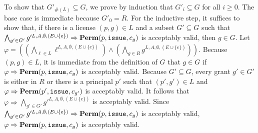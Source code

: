 \documentclass{acmtrans2m}
\newcommand{\rimp}{\Rightarrow}
\newcommand{\<}{
}
\renewcommand{\>}{\rangle}
\newcommand{\union}{\cup}
\renewcommand{\phi}{\varphi}
\newcommand{\card}[1]{\#({#1})}
\newcommand{\Permitted}{\mathit{\bf Perm}}
\newcommand{\cc}{e}
\newcommand{\scc}{E}
\newcommand{\issue}{\mathtt{issue}}
\newcommand{\transwithE}[5]{#1^{#2, #3, #4, #5}}
\begin{document}
\begin{sloppypar}
To show that $G'_{\card{L}} \subseteq G$, we prove by induction that $G'_i\subseteq G$ for all $i\ge 0$.
The base case is immediate because $G'_0 = R$.  For the inductive step, it suffices to show that, if
there is a license $(p,g)\in L$ and a subset $G'\subseteq G$ such that
$\bigwedge_{g'\in G'}\transwithE{g'}{L}{A}{\emptyset}{(E\union\{\cc\})}\rimp\Permitted(p,\issue, c_g)$
is acceptably valid, then $g\in G$.  Let
$\phi = ((\bigwedge_{\ell\in L}\transwithE{\ell}{L}{A}{\emptyset}{(\scc\union\{\cc\})})\land
(\bigwedge_{g\in R}\transwithE{g}{L}{A}{\emptyset}{(\scc\union\{\cc\})}))$.
Because $(p,g)\in L$, it is immediate from the definition of $G$ that $g\in G$ if
$\phi\rimp\Permitted(p, \issue, c_g)$ is acceptably valid.  Because $G'\subseteq G$, every grant
$g'\in G'$ is either in $R$ or there is a principal $p'$ such that $(p', g')\in L$ and
$\phi\rimp\Permitted(p', \issue, c_{g'})$ is acceptably valid.  It follows that
$\phi\rimp\bigwedge_{g'\in G'}\transwithE{g'}{L}{A}{\emptyset}{(E\union\{\cc\})}$ is acceptably valid.
Since
$\bigwedge_{g'\in G'}\transwithE{g'}{L}{A}{\emptyset}{(E\union\{\cc\})}\rimp\Permitted(p,\issue, c_g)$
is acceptably valid, $\phi\rimp\Permitted(p, \issue, c_g)$ is acceptably valid.


\end{sloppypar}
\end{document}
